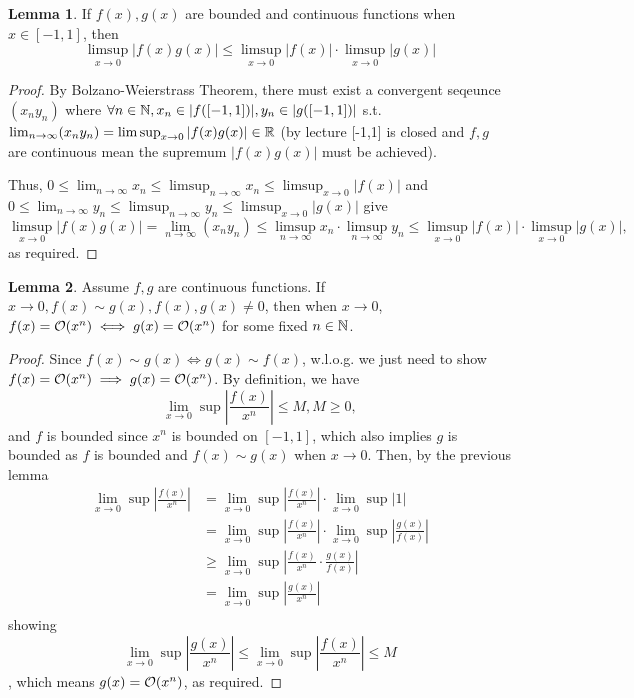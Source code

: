 \documentclass{homework}
\newcommand{\R}{\bb{R}} %
\newcommand{\N}{\bb{N}} %
\newcommand{\ra}{\rightarrow}
\newcommand{\?}{\stackrel{?}{=}}
\theoremstyle{definition}
\newtheorem*{lemma}{Lemma}
\begin{document}
\begin{lemma}
    If $f(x),g(x)$ are bounded and continuous functions when $x\in[-1,1]$, then \[\limsup_{x\to0}|f(x)g(x)|\leq\limsup_{x\to0}|f(x)|\cdot\limsup_{x\to0}|g(x)|\]

    \begin{proof}
        By Bolzano-Weierstrass Theorem, there must exist a convergent seqeunce $(x_n y_n)$ where $\forall n\in\N, x_n\in |f([-1,1])|, y_n\in |g([-1,1])|$ s.t. $\lim_{n\to\infty}(x_n y_n)=\limsup_{x\to0}|f(x)g(x)|\in\R$ (by lecture [-1,1] is closed and $f,g$ are continuous mean the supremum $|f(x)g(x)|$ must be achieved). 
        
        Thus, $0\leq\lim_{n\ra\infty}x_n\leq\limsup_{n\ra\infty}x_n\leq\limsup_{x\ra0}|f(x)|$ and $0\leq\lim_{n\ra\infty}y_n\leq\limsup_{n\ra\infty}y_n\leq\limsup_{x\ra0}|g(x)|$ give $$\limsup_{x\ra0}|f(x)g(x)|=\lim_{n\ra\infty}(x_n y_n)\leq\limsup_{n\ra\infty}x_n\cdot\limsup_{n\ra\infty}y_n\leq \limsup_{x\to0}|f(x)|\cdot\limsup_{x\to0}|g(x)|,$$ as required. 
    \end{proof}
\end{lemma}

\begin{lemma}
    Assume $f,g$ are continuous functions. If $x\to0, f(x)\sim g(x), f(x), g(x)\neq0$, then when $x\to0$, $f(x)=\cal{O}(x^n)\iff g(x)=\cal{O}(x^n)$ for some fixed $n\in\N$.

    \begin{proof}
        Since $f(x)\sim g(x)\iff g(x)\sim f(x)$, w.l.o.g. we just need to show $f(x)=\cal{O}(x^n)\implies g(x)=\cal{O}(x^n)$. By definition, we have \[\lim_{x\to0}\sup|\frac{f(x)}{x^n}|\leq M, M\geq0,\] and $f$ is bounded since $x^n$ is bounded on $[-1,1]$, which also implies $g$ is bounded as $f$ is bounded and $f(x)\sim g(x)$ when $x\to0$. Then, by the previous lemma \begin{align*}
            \lim_{x\to0}\sup|\frac{f(x)}{x^n}|&=\lim_{x\to0}\sup|\frac{f(x)}{x^n}|\cdot\lim_{x\to0}\sup|1|\\
            &=\lim_{x\to0}\sup|\frac{f(x)}{x^n}|\cdot\lim_{x\to0}\sup|\frac{g(x)}{f(x)}|\\
            &\geq \lim_{x\to0}\sup|\frac{f(x)}{x^n}\cdot\frac{g(x)}{f(x)}|\\
            &=\lim_{x\to0}\sup|\frac{g(x)}{x^n}|\\
        \end{align*}
        showing \[\lim_{x\to0}\sup|\frac{g(x)}{x^n}|\leq\lim_{x\to0}\sup|\frac{f(x)}{x^n}|\leq M\], which means $g(x)=\cal{O}(x^n)$, as required.
    \end{proof}
\end{lemma}
\end{document}
